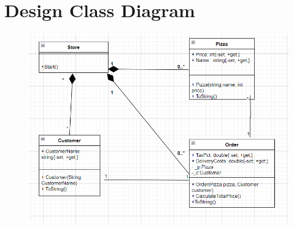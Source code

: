 \section{Design Class Diagram}



\begin{figure}[htbp]
    \center
    \includegraphics[scale=1]{img/UML1ClassDia.PNG}
    \caption{}
\end{figure}



